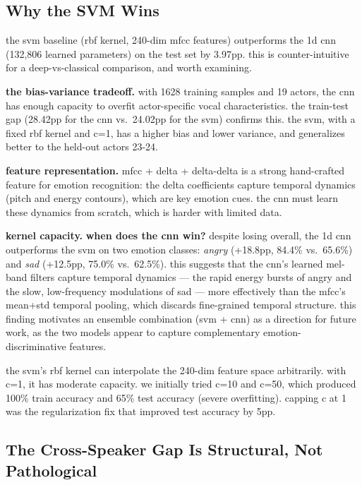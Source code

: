 \documentclass[conference]{IEEEtran}
\begin{document}
{\subsection{Why the SVM Wins}\label{why-the-svm-wins}

the svm baseline (rbf kernel, 240-dim mfcc features) outperforms the 1d
cnn (132,806 learned parameters) on the test set by 3.97pp. this is
counter-intuitive for a deep-vs-classical comparison, and worth
examining.

\textbf{the bias-variance tradeoff.} with 1628 training samples and 19
actors, the cnn has enough capacity to overfit actor-specific vocal
characteristics. the train-test gap (28.42pp for the cnn vs.~24.02pp for
the svm) confirms this. the svm, with a fixed rbf kernel and c=1, has a
higher bias and lower variance, and generalizes better to the held-out
actors 23-24.

\textbf{feature representation.} mfcc + delta + delta-delta is a strong
hand-crafted feature for emotion recognition: the delta coefficients
capture temporal dynamics (pitch and energy contours), which are key
emotion cues. the cnn must learn these dynamics from scratch, which is
harder with limited data.

\textbf{kernel capacity.} 
\textbf{when does the cnn win?} despite losing overall, 
the 1d cnn outperforms the svm on two emotion classes: 
\textit{angry} (+18.8pp, 84.4\% vs.\ 65.6\%) and 
\textit{sad} (+12.5pp, 75.0\% vs.\ 62.5\%). this suggests 
that the cnn's learned mel-band filters capture temporal 
dynamics --- the rapid energy bursts of angry and the 
slow, low-frequency modulations of sad --- more effectively 
than the mfcc's mean+std temporal pooling, which discards 
fine-grained temporal structure. this finding motivates 
an ensemble combination (svm + cnn) as a direction for 
future work, as the two models appear to capture 
complementary emotion-discriminative features.

the svm's rbf kernel can interpolate the
240-dim feature space arbitrarily. with c=1, it has moderate capacity.
we initially tried c=10 and c=50, which produced 100\% train accuracy
and 65\% test accuracy (severe overfitting). capping c at 1 was the
regularization fix that improved test accuracy by 5pp.

\subsection{The Cross-Speaker Gap Is Structural, Not Pathological}\label{the-cross-speaker-gap-is-structural-not-pathological}

}
\end{document}
